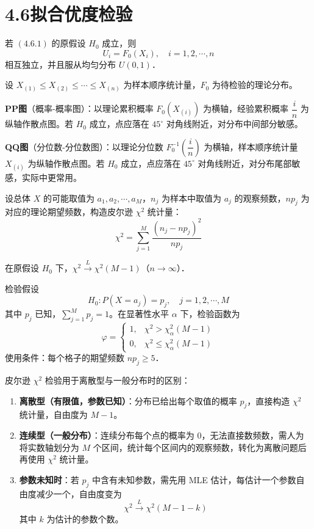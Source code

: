 \section{4.6拟合优度检验
}\begin{theorem}[4.6.1]
若 $(4.6.1)$ 的原假设 $H_0$ 成立，则
\[
U_i = F_0(X_i), \quad i = 1, 2, \cdots, n
\]
相互独立，并且服从均匀分布 $U(0,1)$．
\end{theorem}
\begin{definition}[PP图与QQ图]
设 $X_{(1)} \leqslant X_{(2)} \leqslant \cdots \leqslant X_{(n)}$ 为样本顺序统计量，$F_0$ 为待检验的理论分布。

\textbf{PP图}（概率-概率图）：以理论累积概率 $F_0(X_{(i)})$ 为横轴，经验累积概率 $\dfrac{i}{n}$ 为纵轴作散点图。若 $H_0$ 成立，点应落在 $45^\circ$ 对角线附近，对分布中间部分敏感。

\textbf{QQ图}（分位数-分位数图）：以理论分位数 $F_0^{-1}\!\left(\dfrac{i}{n}\right)$ 为横轴，样本顺序统计量 $X_{(i)}$ 为纵轴作散点图。若 $H_0$ 成立，点应落在 $45^\circ$ 对角线附近，对分布尾部敏感，实际中更常用。
\end{definition}
\begin{definition}
设总体 $X$ 的可能取值为 $a_1, a_2, \cdots, a_M$，$n_j$ 为样本中取值为 $a_j$ 的观察频数，$np_j$ 为对应的理论期望频数，构造皮尔逊 $\chi^2$ 统计量：
\[
\chi^2 = \sum_{j=1}^M \frac{(n_j - np_j)^2}{np_j}
\]
\end{definition}

\begin{theorem}[4.6.2]
在原假设 $H_0$ 下，$\chi^2 \xrightarrow{L} \chi^2(M-1)$（$n \to \infty$）．
\end{theorem}

\begin{definition}
检验假设
\[
H_0: P(X = a_j) = p_j, \quad j = 1, 2, \cdots, M
\]
其中 $p_j$ 已知，$\sum_{j=1}^M p_j = 1$。在显著性水平 $\alpha$ 下，检验函数为
\[
\varphi = \begin{cases} 1, & \chi^2 > \chi^2_\alpha(M-1) \\ 0, & \chi^2 \leqslant \chi^2_\alpha(M-1) \end{cases}
\]
使用条件：每个格子的期望频数 $np_j \geqslant 5$．
\end{definition}
\begin{note}
皮尔逊 $\chi^2$ 检验用于离散型与一般分布时的区别：
\begin{enumerate}
    \item \textbf{离散型（有限值，参数已知）}：分布已给出每个取值的概率 $p_j$，直接构造 $\chi^2$ 统计量，自由度为 $M-1$。

    \item \textbf{连续型（一般分布）}：连续分布每个点的概率为 $0$，无法直接数频数，需人为将实数轴划分为 $M$ 个区间，统计每个区间内的观察频数，转化为离散问题后再使用 $\chi^2$ 统计量。

    \item \textbf{参数未知时}：若 $p_j$ 中含有未知参数，需先用 MLE 估计，每估计一个参数自由度减少一个，自由度变为
    \[
    \chi^2 \xrightarrow{L} \chi^2(M - 1 - k)
    \]
    其中 $k$ 为估计的参数个数。
\end{enumerate}
\end{note}
